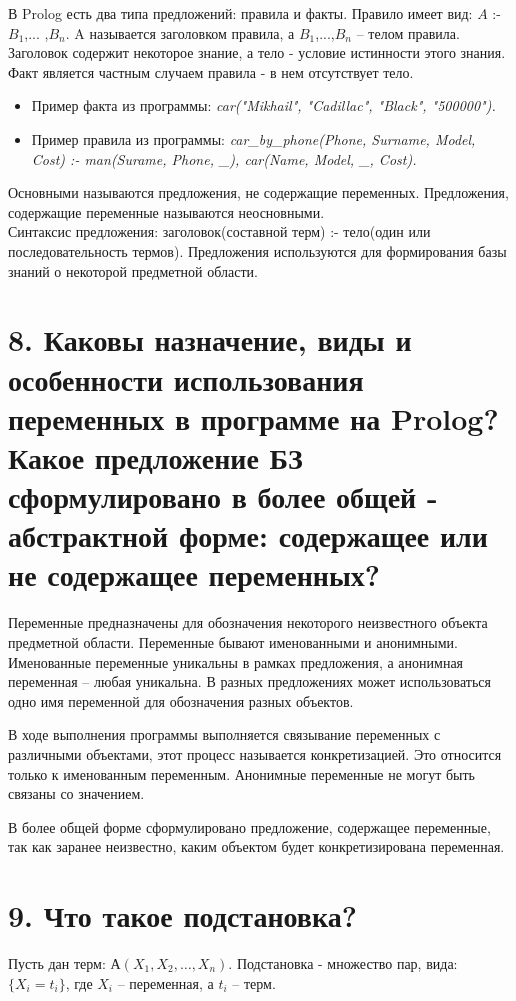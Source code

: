 \documentclass[12pt]{report}
\begin{document}
В Prolog есть два типа предложений: правила и факты. Правило имеет вид: $A$ :- $B_{1}$,... ,$B_{n}$. 
A называется заголовком правила, а $B_{1}$,...,$B_{n}$ – телом правила. Заголовок содержит некоторое знание, а тело - условие истинности этого знания. Факт является частным случаем правила - в нем отсутствует тело. 

\begin{itemize}
	\item Пример факта из программы: \emph{car("Mikhail"{}, "Cadillac"{}, "Black"{}, "500000"). }
	\item Пример правила из программы: \emph{car\_by\_phone(Phone, Surname, Model, Cost) :- man(Surame, Phone, \_), car(Name, Model, \_, Cost). }
\end{itemize}


Основными называются предложения, не содержащие переменных. Предложения, содержащие переменные называются неосновными.\\

Синтаксис предложения: заголовок(составной терм) :- тело(один или последовательность термов). Предложения используются для формирования базы знаний о некоторой предметной области.

\section*{8. Каковы назначение, виды и особенности использования переменных в программе на Prolog? Какое предложение БЗ сформулировано в более общей - абстрактной форме: содержащее или не содержащее переменных?}

Переменные предназначены для обозначения некоторого неизвестного объекта предметной области. Переменные бывают именованными и анонимными. Именованные переменные уникальны в рамках предложения, а анонимная переменная – любая уникальна. В разных предложениях может использоваться одно имя переменной для обозначения разных объектов.

В ходе выполнения программы выполняется связывание переменных с различными объектами, этот процесс называется конкретизацией. Это относится только к именованным переменным. Анонимные переменные не могут быть связаны со значением.

В более общей форме сформулировано предложение, содержащее переменные, так как заранее неизвестно, каким объектом будет конкретизирована переменная.

\section*{9. Что такое подстановка?}

Пусть дан терм: $А(X_1, X_2,  \dots ,X_n)$.
Подстановка - множество пар, вида: $\{X _ i = t _ i\}$, где $X_i$ –   переменная, а $t_i$ –  терм.

	
\end{document}
